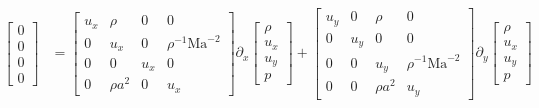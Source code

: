 \documentclass[letterpaper,11pt,nointlimits,reqno]{amsart}
\newcommand{\Mach}[1][]{\mbox{Ma}_{#1}}
\begin{document}
\begin{align}
  \begin{bmatrix} 0 \\ 0 \\ 0 \\ 0 \end{bmatrix}
&=
  \begin{bmatrix}
     u_x  &  \rho      &  0    &  0                    \\
     0    &  u_x       &  0    &  \rho^{-1}\Mach^{-2}  \\
     0    &  0         &  u_x  &  0                    \\
     0    &  \rho{}a^2 &  0    &  u_x
  \end{bmatrix}
  \partial_x
  \begin{bmatrix} \rho \\ u_x \\ u_y \\ p \end{bmatrix}
+
  \begin{bmatrix}
     u_y  &  0    &  \rho       &  0                    \\
     0    &  u_y  &  0          &  0                    \\
     0    &  0    &  u_y        &  \rho^{-1}\Mach^{-2}  \\
     0    &  0    &  \rho{}a^2  &  u_y
  \end{bmatrix}
  \partial_y
  \begin{bmatrix} \rho \\ u_x \\ u_y \\ p \end{bmatrix}
\end{align}
%


\newcommand*{\doi}[1]{\href{http://dx.doi.org/\detokenize{#1}}{doi: #1}}


\end{document}

